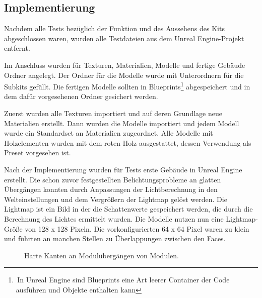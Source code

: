 \subsection{Implementierung}\label{implementierung2}
Nachdem alle Tests bezüglich der Funktion und des Aussehens des Kits abgeschlossen waren, wurden alle Testdateien aus dem Unreal Engine-Projekt entfernt.
\par
Im Anschluss wurden für Texturen, Materialien, Modelle und fertige Gebäude Ordner angelegt. Der Ordner für die Modelle wurde mit Unterordnern für die Subkits gefüllt. Die fertigen Modelle sollten in Blueprints\footnote{\,In Unreal Engine sind Blueprints eine Art leerer Container der Code ausführen und Objekte enthalten kann} abgespeichert und in dem dafür vorgesehenen Ordner gesichert werden.
\par
Zuerst wurden alle Texturen importiert und auf deren Grundlage neue Materialien erstellt. Dann wurden die Modelle importiert und jedem Modell wurde ein Standardset an Materialien zugeordnet. Alle Modelle mit Holzelementen wurden mit dem roten Holz ausgestattet, dessen Verwendung als Preset vorgesehen ist.
\par
Nach der Implementierung wurden für  Tests erste Gebäude in Unreal Engine erstellt. Die schon zuvor festgestellten Belichtungsprobleme an glatten Übergängen konnten durch Anpassungen der Lichtberechnung in den Welteinstellungen und dem Vergrößern der Lightmap gelöst werden. Die Lightmap ist ein Bild in der die Schattenwerte gespeichert werden, die durch die Berechnung des Lichtes ermittelt wurden. Die Modelle nutzen nun eine Lightmap-Größe von 128 x 128 Pixeln. Die vorkonfigurierten 64 x 64 Pixel waren zu klein und führten an manchen Stellen zu Überlappungen zwischen den Faces.
\begin{figure}[H]
\centering
  \caption{Harte Kanten an Modulübergängen von Modulen.}
	\label{LichtProblem}
\end{figure}
